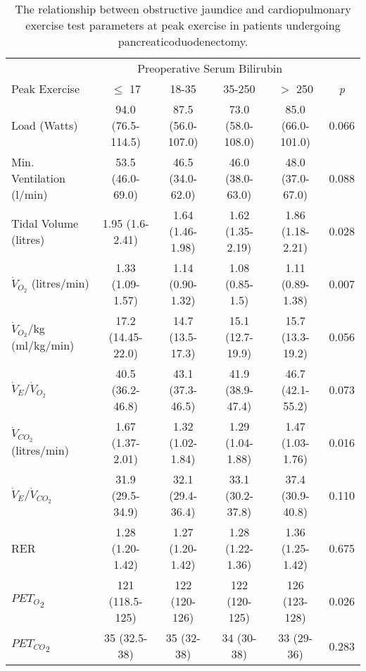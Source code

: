 \begin{sidewaystable}[p]
	\caption{The relationship  between obstructive jaundice and cardiopulmonary exercise test parameters at peak exercise in patients undergoing pancreaticoduodenectomy.  }
	\label{table:cpet_oj_peak}
	\centering
	\renewcommand{\arraystretch}{1.4} %
	\begin{tabular}{|l| c c c c c|}
		\hline
		                               &               \multicolumn{4}{c}{Preoperative Serum Bilirubin}                &  \\
		Peak Exercise                               & $\leq$ 17         & 18-35             & 35-250            & $>$ 250            & \textit{p} \\ \hline
		Load  (Watts)                  & 94.0 (76.5-114.5) & 87.5 (56.0-107.0) & 73.0 (58.0-108.0) & 85.0 (66.0-101.0)  & 0.066      \\
		Min. Ventilation (l/min)       & 53.5 (46.0-69.0)  & 46.5 (34.0-62.0)  & 46.0 (38.0-63.0)  & 48.0 (37.0-67.0)   & 0.088      \\
		Tidal Volume (litres)          & 1.95 (1.6-2.41)   & 1.64 (1.46-1.98)  & 1.62 (1.35-2.19)  & 1.86 (1.18-2.21)   & 0.028      \\
		$\dot{V}_{O_2}$ (litres/min)   & 1.33 (1.09-1.57)  & 1.14 (0.90-1.32)  & 1.08 (0.85-1.5)   & 1.11 (0.89-1.38)   & 0.007      \\
		$\dot{V}_{O_2}$/kg (ml/kg/min) & 17.2 (14.45-22.0) & 14.7 (13.5-17.3)  & 15.1 (12.7-19.9)  & 15.7 (13.3-19.2)   & 0.056      \\
		$\dot{V}_E/\dot{V}_{O_2}$      & 40.5 (36.2-46.8)  & 43.1 (37.3-46.5)  & 41.9 (38.9-47.4)  & 46.7 (42.1-55.2)   & 0.073      \\
		$\dot{V}_{CO_2}$ (litres/min)  & 1.67 (1.37-2.01)  & 1.32 (1.02-1.84)  & 1.29 (1.04-1.88)  & 1.47 (1.03-1.76)   & 0.016      \\
		$\dot{V}_E/\dot{V}_{CO_2}$     & 31.9 (29.5-34.9)  & 32.1 (29.4-36.4)  & 33.1 (30.2-37.8)  & 37.4 (30.9-40.8)   & 0.110      \\
		RER                            & 1.28 (1.20-1.42)  & 1.27 (1.20-1.42)  & 1.28 (1.22-1.36)  & 1.36 (1.25-1.42)   & 0.675      \\
		${PET_O}_2$                    & 121 (118.5-125)   & 122 (120-126)     & 122 (120-125)     & 126 (123-128)      & 0.026      \\
		${PET_{CO}}_2$                 & 35 (32.5-38)      & 35 (32-38)        & 34 (30-38)        & 33 (29-36)         & 0.283      \\

\end{tabular}
\end{sidewaystable}
